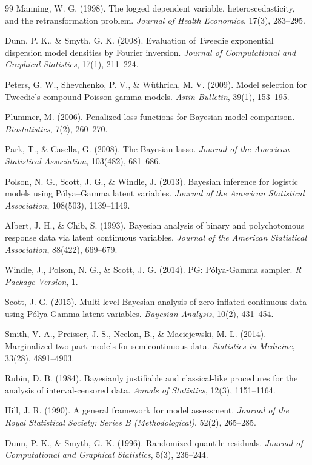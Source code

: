 \documentclass[11pt, a4paper]{article}
\begin{document}
\begin{thebibliography}{99}
 Manning, W. G. (1998). The logged dependent variable, heteroscedasticity, and the retransformation problem. \textit{Journal of Health Economics}, 17(3), 283--295.

 Dunn, P. K., \& Smyth, G. K. (2008). Evaluation of Tweedie exponential dispersion model densities by Fourier inversion. \textit{Journal of Computational and Graphical Statistics}, 17(1), 211--224.

 Peters, G. W., Shevchenko, P. V., \& W\"{u}thrich, M. V. (2009). Model selection for Tweedie’s compound Poisson-gamma models. \textit{Astin Bulletin}, 39(1), 153--195.

 Plummer, M. (2006). Penalized loss functions for Bayesian model comparison. \textit{Biostatistics}, 7(2), 260--270.

 Park, T., \& Casella, G. (2008). The Bayesian lasso. \textit{Journal of the American Statistical Association}, 103(482), 681--686.

 Polson, N. G., Scott, J. G., \& Windle, J. (2013). Bayesian inference for logistic models using P\'{o}lya--Gamma latent variables. \textit{Journal of the American Statistical Association}, 108(503), 1139--1149.

 Albert, J. H., \& Chib, S. (1993). Bayesian analysis of binary and polychotomous response data via latent continuous variables. \textit{Journal of the American Statistical Association}, 88(422), 669--679.

 Windle, J., Polson, N. G., \& Scott, J. G. (2014). PG: P\'{o}lya-Gamma sampler. \textit{R Package Version}, 1.

 Scott, J. G. (2015). Multi-level Bayesian analysis of zero-inflated continuous data using P\'{o}lya-Gamma latent variables. \textit{Bayesian Analysis}, 10(2), 431--454.

 Smith, V. A., Preisser, J. S., Neelon, B., \& Maciejewski, M. L. (2014). Marginalized two-part models for semicontinuous data. \textit{Statistics in Medicine}, 33(28), 4891--4903.

 Rubin, D. B. (1984). Bayesianly justifiable and classical-like procedures for the analysis of interval-censored data. \textit{Annals of Statistics}, 12(3), 1151--1164.

 Hill, J. R. (1990). A general framework for model assessment. \textit{Journal of the Royal Statistical Society: Series B (Methodological)}, 52(2), 265--285.

 Dunn, P. K., \& Smyth, G. K. (1996). Randomized quantile residuals. \textit{Journal of Computational and Graphical Statistics}, 5(3), 236--244.

\end{thebibliography}
\end{document}
